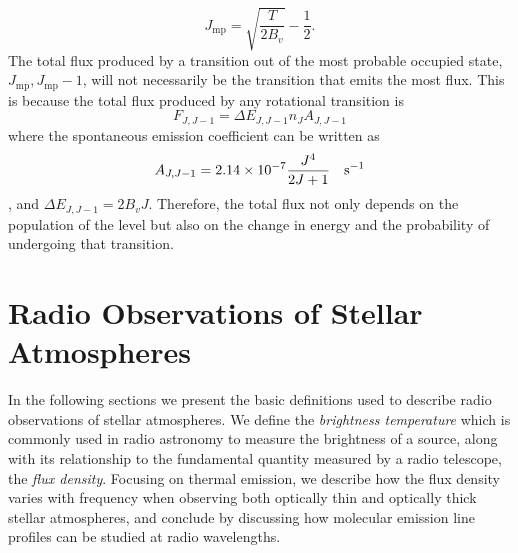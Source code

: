 \begin{equation}
J_{\mathrm{mp}}=\sqrt{\frac{T}{2B_{v}}}-\frac{1}{2}.
\end{equation}
The total flux produced by a transition out of the most probable occupied state, $J_{\mathrm{mp}}, J_{\mathrm{mp}}-1$, will not necessarily be the transition that emits the most flux. This is because the total flux produced by any rotational transition is
\begin{equation}
F_{J,J-1}=\Delta E_{J,J-1}n_{J}A_{{J,J-1}}
\end{equation}
where the spontaneous emission coefficient can be written as
\begin{equation}
A_{J,J-1} =2.14\times 10^{-7}\frac{J^4}{2J+1} \ \ \ \rm{s}^{-1}
\end{equation}
\citep{draine_2011}, and $\Delta E_{J,J-1}=2B_{v}J$. Therefore, the total flux not only depends on the population of the level but also on the change in energy and the probability of undergoing that transition.

\section{Radio Observations of Stellar Atmospheres}\label{sec:1.8}
In the following sections we present the basic definitions used to describe radio observations of stellar atmospheres. We define the \textit{brightness temperature} which is commonly used in radio astronomy to measure the brightness of a source, along with its relationship to the fundamental quantity measured by a radio telescope, the \textit{flux density}. Focusing on thermal emission, we describe how the flux density varies with frequency when observing both optically thin and optically thick stellar atmospheres, and conclude by discussing how molecular emission line profiles can be studied at radio wavelengths.

